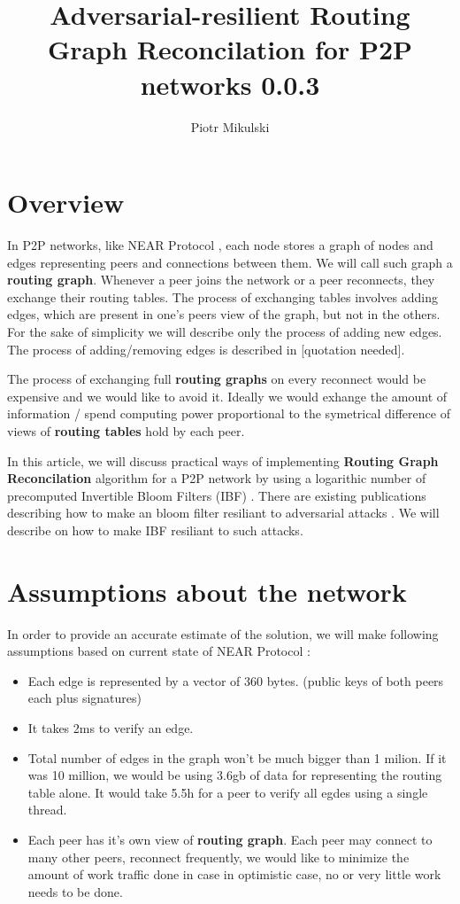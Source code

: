 \documentclass[11pt]{article}
\title{\textbf{Adversarial-resilient  Routing Graph Reconcilation for P2P networks 0.0.3}}
\author{Piotr Mikulski}
\date{}
\begin{document}
\maketitle
\thispagestyle{empty}

\section{Overview}
In P2P networks, like NEAR Protocol \cite{near}, each node stores a graph of nodes and edges representing peers and connections between them.
We will call such graph a \textbf{routing graph}.
Whenever a peer joins the network or a peer reconnects, they exchange their routing tables.
The process of exchanging tables involves adding edges, which are present in one's peers view of the graph, but not in the others.
For the sake of simplicity we will describe only the process of adding new edges.
The process of adding/removing edges is described in [quotation needed].

The process of exchanging full \textbf{routing graphs} on every reconnect would be expensive and we would like to avoid it.
Ideally we would exhange the amount of information / spend computing power proportional to the symetrical difference of views of \textbf{routing tables} hold by each peer.

In this article, we will discuss practical ways of implementing \textbf{Routing Graph Reconcilation} algorithm for a P2P network by using a logarithic number of precomputed Invertible Bloom Filters (IBF)
 \cite{esrwpc}.
There are existing publications describing how to make an bloom filter resiliant to adversarial attacks \cite{adversarial}.
We will describe on how to make IBF resiliant to such attacks.

\section{Assumptions about the network}
In order to provide an accurate estimate of the solution, we will make following assumptions based on current state of NEAR Protocol \cite{near}:
\begin{itemize}
\item Each edge is represented by a vector of 360 bytes. (public keys of both peers each plus signatures)
\item It takes 2ms to verify an edge.
\item Total number of edges in the graph won't be much bigger than 1 milion.  If it was 10 million, we would be using 3.6gb of data for representing the routing table alone. It would take 5.5h for a peer to verify all egdes using a single thread.
\item Each peer has it's own view of \textbf{routing graph}. Each peer may connect to many other peers, reconnect frequently, we would like to minimize the amount of work traffic done in case in optimistic case, no or very little work needs to be done.

\end{itemize}
\end{document}
